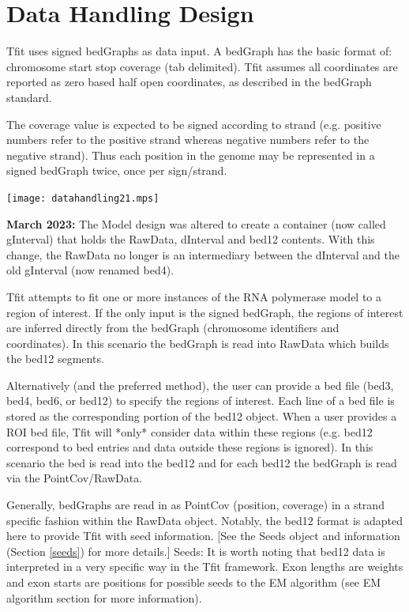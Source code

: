 \documentclass[11pt]{article}
\begin{document}
\section{Data Handling Design}
Tfit uses signed bedGraphs as data input.  A bedGraph has the basic format of: 
chromosome start stop coverage (tab delimited).  Tfit assumes all coordinates are
reported as zero based half open coordinates, as described in the bedGraph 
standard.  

The coverage value is expected to be signed according to strand (e.g. positive 
numbers refer to the positive strand whereas negative numbers refer to the 
negative strand).  Thus each position in the genome may be represented in a 
signed bedGraph twice, once per sign/strand.

\texttt{[image: datahandling21.mps]}

\textbf{March 2023:} The Model design was altered to create a container 
(now called gInterval) that holds the RawData, dInterval and bed12 contents. 
With this change, the RawData no longer is an intermediary between the dInterval
and the old gInterval (now renamed bed4).  

Tfit attempts to fit one or more instances of the RNA polymerase model to a 
region of interest.  If the only input is the signed bedGraph, the regions of 
interest are inferred directly from the bedGraph (chromosome identifiers 
and coordinates). In this scenario the bedGraph is read into RawData which 
builds the bed12 segments.

Alternatively (and the preferred method), the user can provide a bed 
file (bed3, bed4, bed6, or bed12) to specify the regions of interest.  Each 
line of a bed file is stored as the corresponding portion of the bed12 object.
When a user provides a ROI bed file, Tfit will *only* consider data within 
these regions (e.g. bed12 correspond to bed entries and data outside these 
regions is ignored).  In this scenario the bed is read into the bed12 and for 
each bed12 the bedGraph is read via the PointCov/RawData. 

Generally, bedGraphs are read in as PointCov (position, coverage) in a strand 
specific fashion within the RawData object.  Notably, the bed12 format is 
adapted here to provide Tfit with seed information.  [See the Seeds object and 
information (Section \ref{seeds}) for more details.] Seeds: It is worth noting 
that bed12 data is interpreted in a very specific way in the Tfit framework.   
Exon lengths are weights and exon starts are positions for possible seeds 
to the EM algorithm (see EM algorithm section for more information).
\end{document}
